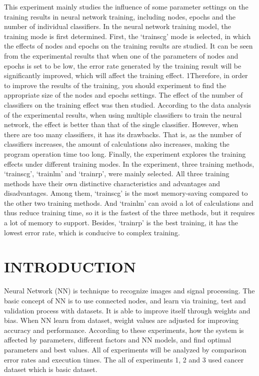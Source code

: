\documentclass[a4paper, 12pt]{report}
\begin{document}
This experiment mainly studies the influence of some parameter settings on the training
results in neural network training, including nodes, epochs and the number of individual
classifiers. In the neural network training model, the training mode is first determined.
First, the ‘trainscg’ mode is selected, in which the effects of nodes and epochs on the
training results are studied. It can be seen from the experimental results that when one
of the parameters of nodes and epochs is set to be low, the error rate generated by the
training result will be significantly improved, which will affect the training effect.
1Therefore, in order to improve the results of the training, you should experiment to find
the appropriate size of the nodes and epochs settings. The effect of the number of
classifiers on the training effect was then studied. According to the data analysis of the
experimental results, when using multiple classifiers to train the neural network, the
effect is better than that of the single classifier. However, when there are too many
classifiers, it has its drawbacks. That is, as the number of classifiers increases, the
amount of calculations also increases, making the program operation time too long.
Finally, the experiment explores the training effects under different training modes. In
the experiment, three training methods, ‘trainscg’, ‘trainlm’ and ‘trainrp’, were mainly
selected. All three training methods have their own distinctive characteristics and
advantages and disadvantages. Among them, ‘trainscg’ is the most memory-saving
compared to the other two training methods. And ‘trainlm’ can avoid a lot of
calculations and thus reduce training time, so it is the fastest of the three methods, but
it requires a lot of memory to support. Besides, ‘trainrp’ is the best training, it has the
lowest error rate, which is conducive to complex training.
\cleardoublepage

\section*{INTRODUCTION}
Neural Network (NN) is technique to recognize images and signal processing. The basic concept of NN is to use connected nodes, and learn via training, test and validation process with datasets. It is able to improve itself through weights and bias. When NN learn from dataset, weight values are adjusted for improving accuracy and performance. According to these experiments, how the system is affected by parameters, different factors and NN models, and find optimal parameters and best values. All of experiments will be analyzed by comparison error rates and execution times. The all of experiments 1, 2 and 3 used cancer dataset which is basic dataset.
\end{document}
